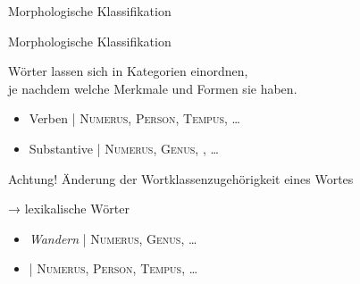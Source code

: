 \begin{frame}
  {Morphologische Klassifikation}
  \pause
  \begin{exe}
    \ex
    \begin{xlist}
        \pause
    \end{xlist}
        \pause
    \ex
    \begin{xlist}
        \pause
        \pause
    \end{xlist}
  \end{exe}
\end{frame}

\begin{frame}
  {Morphologische Klassifikation}
  \pause
  \begin{center}
    \Large Wörter lassen sich in Kategorien einordnen,\\
    je nachdem \alert{welche Merkmale und Formen sie haben}.
  \end{center}
  \Zeile
  \pause
  \begin{itemize}[<+->]
    \item \alert{Verben} | \textsc{Numerus}, \textsc{Person}, \textsc{Tempus}, \ldots
    \item \alert{Substantive} | \textsc{Numerus}, \textsc{Genus}, , \ldots
  \end{itemize}
\end{frame}

\begin{frame}
  {Achtung!}
  \pause
  \alert{Änderung der Wortklassenzugehörigkeit} eines Wortes
  \pause
  \Zeile
  \begin{exe}
    \ex\label{ex:paradigmatischeklassifikation017}\begin{xlist}
      \pause
    \end{xlist}
  \end{exe}
  \pause
  \Zeile
  →  lexikalische Wörter
  \pause
  \begin{itemize}[<+->]
    \item \alert{\textit{Wandern}} | \textsc{Numerus}, \textsc{Genus}, \ldots
    \item {} | \textsc{Numerus}, \textsc{Person}, \textsc{Tempus}, \ldots
  \end{itemize}
\end{frame}


